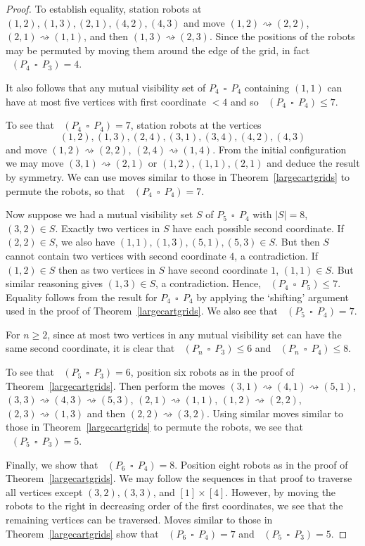 \documentclass[a4paper,12pt]{article}
\DeclareMathOperator{\mobmv}{Mob_{\mu}}
\DeclareMathOperator{\cmobmv}{Mob^*_{\mu}}
\DeclareMathOperator{\cp}{\,\square\,}
\theoremstyle{definition}
\newcommand{\move}{\rightsquigarrow}
\begin{document}
\begin{proof}
		To establish equality, station robots at $(1,2), (1,3), (2,1), (4,2), (4,3)$ and move $(1,2) \move (2,2)$, $(2,1) \move (1,1)$, and then $(1,3) \move (2,3)$. Since the positions of the robots may be permuted by moving them around the edge of the grid, in fact $\cmobmv(P_4 \cp P_3) = 4$.
		
		It also follows that any mutual visibility set of $P_4 \cp P_4$ containing $(1,1)$ can have at most five vertices with first coordinate $<4$ and so $\mobmv(P_4 \cp P_4) \leq 7$.
		
		To see that $\mobmv(P_4 \cp P_4) = 7$, station robots at the vertices \[ (1,2), (1,3), (2,4), (3,1), (3,4), (4,2), (4,3)\] and move $(1,2) \move (2,2)$, $(2,4) \move (1,4)$. From the initial configuration we may move $(3,1) \move (2,1)$ or $(1,2), (1,1), (2,1)$ and deduce the result by symmetry. We can use moves similar to those in Theorem~\ref{largecartgrids} to permute the robots, so that $\cmobmv(P_4 \cp P_4) = 7$.
		
		Now suppose we had a mutual visibility set $S$ of $P_5 \cp P_4$ with $|S| = 8$, $(3,2) \in S$. Exactly two vertices in $S$ have each possible second coordinate. If $(2,2) \in S$, we also have $(1,1), (1,3), (5,1), (5,3) \in S$. But then $S$ cannot contain two vertices with second coordinate $4$, a contradiction. If $(1,2) \in S$ then as two vertices in $S$ have second coordinate $1$, $(1,1) \in S$. But similar reasoning gives $(1,3) \in S$, a contradiction. Hence, $\mobmv(P_4 \cp P_5) \leq 7$. Equality follows from the result for $P_4 \cp P_4$ by applying the `shifting' argument used in the proof of Theorem~\ref{largecartgrids}. We also see that $\cmobmv(P_5 \cp P_4) = 7$.
		
		For $n \geq 2$, since at most two vertices in any mutual visibility set can have the same second coordinate, it is clear that $\mobmv(P_n \cp P_3) \leq 6$ and $\mobmv(P_n \cp P_4) \leq 8$.
		
		To see that $\mobmv(P_5 \cp P_3) = 6$, position six robots as in the proof of Theorem~\ref{largecartgrids}. Then perform the moves $(3,1) \move (4,1) \move (5,1)$, $(3,3) \move (4,3) \move (5,3)$, $(2,1) \move (1,1)$, $(1,2) \move (2,2)$, $(2,3) \move (1,3)$ and then $(2,2) \move (3,2)$. Using similar moves similar to those in Theorem~\ref{largecartgrids} to permute the robots, we see that $\cmobmv(P_5 \cp P_3) = 5$.
		
		Finally, we show that $\mobmv(P_6 \cp P_4) = 8$. Position eight robots as in the proof of Theorem~\ref{largecartgrids}. We may follow the sequences in that proof to traverse all vertices except $(3,2), (3,3)$, and $[1] \times [4]$. However, by moving the robots to the right in decreasing order of the first coordinates, we see that the remaining vertices can be traversed. Moves similar to those in Theorem~\ref{largecartgrids} show that $\mobmv(P_6 \cp P_4) = 7$ and $\mobmv(P_5 \cp P_3) = 5$.
	\end{proof}
	
\end{document}
